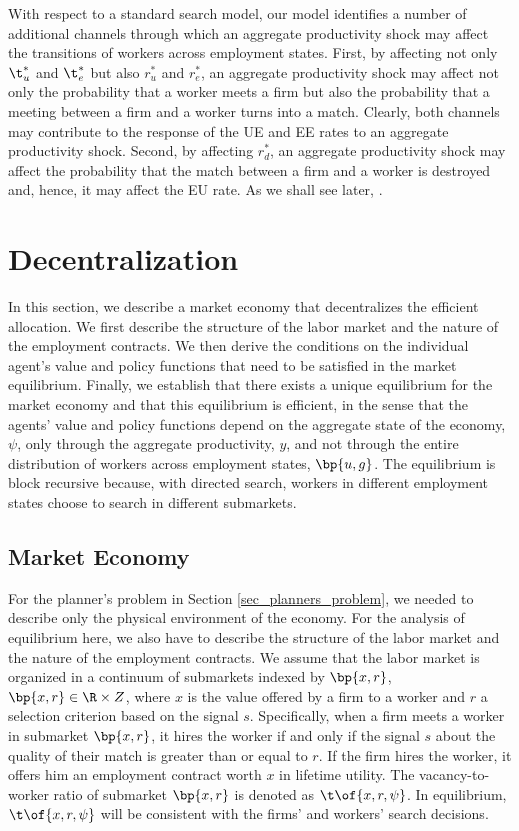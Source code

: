\documentclass[12pt]{article}
\newcommand{\highlightP}[1]{{\emph{\color{MyPink}{#1}}}}
\theoremstyle{definition}
\begin{document}
With respect to a standard search model, our model identifies a number of additional channels through which an aggregate productivity shock may affect the transitions of workers across employment states. First, by affecting not only $\t_u^*$ and $\t_e^*$ but also $r_u^*$ and $r_e^*$, an aggregate productivity shock may affect not only the probability that a worker meets a firm but also the probability that a meeting between a firm and a worker turns into a match. Clearly, both channels may contribute to the response of the UE and EE rates to an aggregate productivity shock. Second, by affecting $r_d^*$, an aggregate productivity shock may affect the probability that the match between a firm and a worker is destroyed and, hence, it may affect the EU rate. As we shall see later, \highlightP{the quantitative importance of these additional channels depends on the informativeness of the signals and on the shape of the distribution of match-specific productivity}.

\section{Decentralization}

In this section, we describe a market economy that decentralizes the efficient allocation. We first describe the structure of the labor market and the nature of the employment contracts. We then derive the conditions on the individual agent's value and policy functions that need to be satisfied in the market equilibrium. Finally, we establish that there exists a unique equilibrium for the market economy and that this equilibrium is efficient, in the sense that the agents' value and policy functions depend on the aggregate state of the economy, $\psi$, only through the aggregate productivity, $y$, and not through the entire distribution of workers across employment states, $\bp{u, g}$. The equilibrium is block recursive because, with directed search, workers in different employment states choose to search in different submarkets.

\subsection{Market Economy}

For the planner's problem in Section \ref{sec_planners_problem}, we needed to describe only the physical environment of the economy. For the analysis of equilibrium here, we also have to describe the structure of the labor market and the nature of the employment contracts. We assume that the labor market is organized in a continuum of submarkets indexed by $\bp{x, r}$, $\bp{x, r} \in \R \times Z$, where $x$ is the value offered by a firm to a worker and $r$ a selection criterion based on the signal $s$. Specifically, when a firm meets a worker in submarket $\bp{x,r}$, it hires the worker if and only if the signal $s$ about the quality of their match is greater than or equal to $r$. If the firm hires the worker, it offers him an employment contract worth $x$ in lifetime utility. The vacancy-to-worker ratio of submarket $\bp{x, r}$ is denoted as $\t\of{x, r, \psi}$. In equilibrium, $\t\of{x, r, \psi}$ will be consistent with the firms' and workers' search decisions. 
\end{document}

